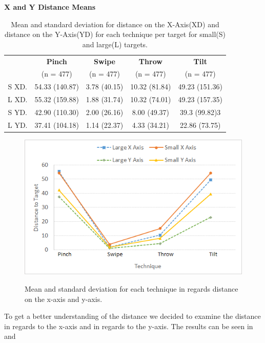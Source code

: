 \begin{table}[H]
	\centering
	\textbf{X and Y Distance Means}\\[4pt]
	\begin{adjustbox}{width=\columnwidth}
	\begin{tabular}{|c|c|c|c|c|}
		\hline
		\rowcolor[HTML]{9B9B9B} 
		& \textbf{Pinch} & \textbf{Swipe} & \textbf{Throw} & \textbf{Tilt} \\
		\rowcolor[HTML]{9B9B9B} 
		& (n = 477) & (n = 477) & (n = 477) & (n = 477) \\ \hline
		S XD. & 54.33 (140.87) & 3.78 (40.15) & 10.32 (81.84) & 49.23 (151.36) \\ \hline
		L XD. & 55.32 (159.88) & 1.88 (31.74) & 10.32 (74.01) & 49.23 (157.35) \\ \hline
		S YD. & 42.90 (110.30) & 2.00 (26.16) & 8.00 (49.37) & 39.3 (99.82)3 \\ \hline
		L YD. & 37.41 (104.18) & 1.14 (22.37) & 4.33 (34.21) & 22.86 (73.75) \\ \hline
	\end{tabular}
	\end{adjustbox}
	\caption{Mean and standard deviation for distance on the X-Axis(XD) and distance on the Y-Axis(YD) for each technique per target for small(S) and large(L) targets.}
	\label{tab:distanceXY}
\end{table}

\begin{figure}[H]
	{\includegraphics[width = 1\columnwidth ]{images/distance_axis.png}} 
	\caption{
		Mean and standard deviation for each technique in regards distance on the x-axis and y-axis.
	}
	\label{fig:distanceXYResults}
\end{figure}

To get a better understanding of the distance we decided to examine the distance in regards to the x-axis and in regards to the y-axis.
The results can be seen in  and 

